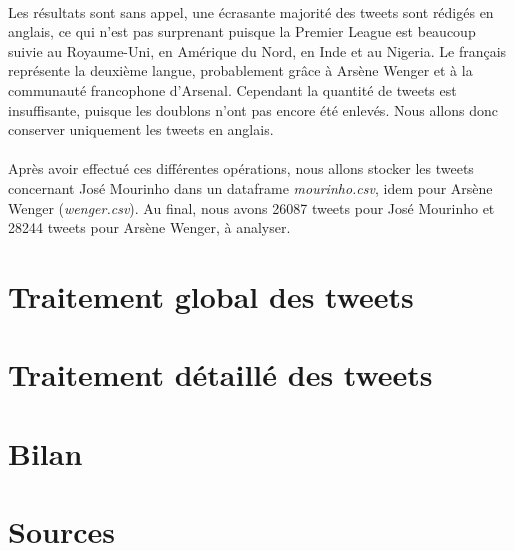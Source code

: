 \documentclass[14pt, openany]{article}
\begin{document}
\paragraph{}
Les résultats sont sans appel, une écrasante majorité des tweets sont rédigés en anglais, ce qui n'est pas surprenant puisque la Premier League est beaucoup suivie au Royaume-Uni, en Amérique du Nord, en Inde et au Nigeria. Le français représente la deuxième langue, probablement grâce à Arsène Wenger et à la communauté francophone d'Arsenal. Cependant la quantité de tweets est insuffisante, puisque les doublons n'ont pas encore été enlevés. Nous allons donc conserver uniquement les tweets en anglais.
\paragraph{}
Après avoir effectué ces différentes opérations, nous allons stocker les tweets concernant José Mourinho dans un dataframe \textit{mourinho.csv}, idem pour Arsène Wenger (\textit{wenger.csv}). Au final, nous avons 26087 tweets pour José Mourinho et 28244 tweets pour Arsène Wenger, à analyser.
\section{Traitement global des tweets}

\section{Traitement détaillé des tweets}

\section{Bilan}

\section{Sources}
\end{document}
